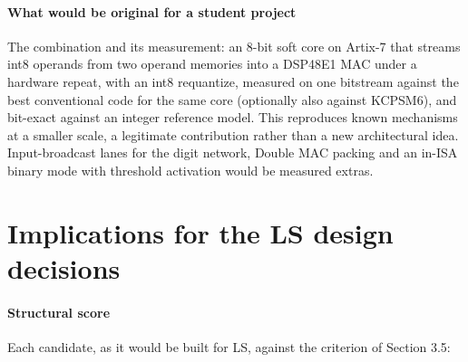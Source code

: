 \paragraph{What would be original for a student project} The combination and its measurement: an 8-bit soft core on Artix-7 that streams int8 operands from two operand memories into a DSP48E1 MAC under a hardware repeat, with an int8 requantize, measured on one bitstream against the best conventional code for the same core (optionally also against KCPSM6), and bit-exact against an integer reference model. This reproduces known mechanisms at a smaller scale, a legitimate contribution rather than a new architectural idea. Input-broadcast lanes for the digit network, Double MAC packing and an in-ISA binary mode with threshold activation would be measured extras.

\section{Implications for the LS design decisions}

\paragraph{Structural score} Each candidate, as it would be built for LS, against the criterion of Section 3.5:

